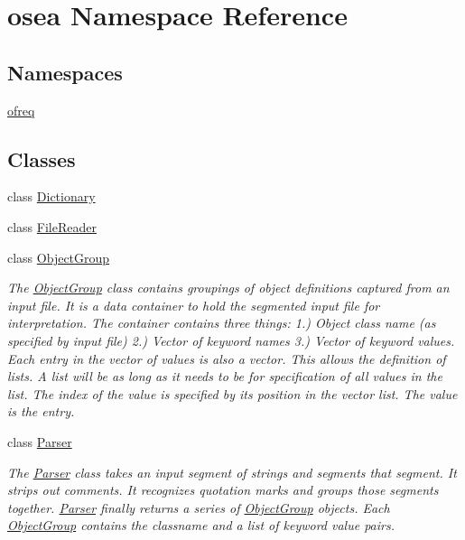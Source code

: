 \hypertarget{namespaceosea}{\section{osea Namespace Reference}
\label{namespaceosea}
}
\subsection*{Namespaces}
\begin{DoxyCompactItemize}
\item 
\hyperlink{namespaceosea_1_1ofreq}{ofreq}
\end{DoxyCompactItemize}
\subsection*{Classes}
\begin{DoxyCompactItemize}
\item 
class \hyperlink{classosea_1_1_dictionary}{Dictionary}
\item 
class \hyperlink{classosea_1_1_file_reader}{File\-Reader}
\item 
class \hyperlink{classosea_1_1_object_group}{Object\-Group}
\begin{DoxyCompactList}\small\item\em The \hyperlink{classosea_1_1_object_group}{Object\-Group} class contains groupings of object definitions captured from an input file. It is a data container to hold the segmented input file for interpretation. The container contains three things\-: 1.) Object class name (as specified by input file) 2.) Vector of keyword names 3.) Vector of keyword values. Each entry in the vector of values is also a vector. This allows the definition of lists. A list will be as long as it needs to be for specification of all values in the list. The index of the value is specified by its position in the vector list. The value is the entry. \end{DoxyCompactList}\item 
class \hyperlink{classosea_1_1_parser}{Parser}
\begin{DoxyCompactList}\small\item\em The \hyperlink{classosea_1_1_parser}{Parser} class takes an input segment of strings and segments that segment. It strips out comments. It recognizes quotation marks and groups those segments together. \hyperlink{classosea_1_1_parser}{Parser} finally returns a series of \hyperlink{classosea_1_1_object_group}{Object\-Group} objects. Each \hyperlink{classosea_1_1_object_group}{Object\-Group} contains the classname and a list of keyword value pairs. \end{DoxyCompactList}\item 

\end{DoxyCompactItemize}
